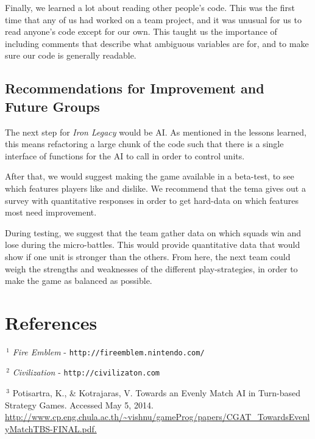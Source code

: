 \documentclass{article}
\begin{document}
Finally, we learned a lot about reading other people's code.
    This was the first time that any of us had worked on a team project,
    and it was unusual for us to read anyone's code except for our own.
    This taught us the importance of including comments that describe what
    ambiguous variables are for, and to make sure our code is generally
    readable.

\subsection*{Recommendations for Improvement and Future Groups}

The next step for \emph{Iron Legacy} would be AI.
    As mentioned in the lessons learned, this means refactoring a large
    chunk of the code such that there is a single interface
    of functions for the AI to call in order to control units.

After that, we would suggest making the game available in a beta-test,
    to see which features players like and dislike.
    We recommend that the tema gives out a survey with quantitative
    responses in order to get hard-data on which features most need
    improvement.

During testing, we suggest that the team gather data on which squads
    win and lose during the micro-battles.
    This would provide quantitative data that would show if one unit
    is stronger than the others.
    From here, the next team could weigh the strengths and
    weaknesses of the different play-strategies, in order to make
    the game as balanced as possible.


\section*{References}

\noindent
$\,^1$
\emph{Fire Emblem} - {\tt http://fireemblem.nintendo.com/}

\vspace{.3em}

\noindent
$\,^2$
\emph{Civilization} - {\tt http://civilizaton.com}

\vspace{.3em}

\noindent
\hangindent=1cm
$\,^3$
Potisartra, K., \& Kotrajaras, V. Towards an Evenly Match AI in Turn-based Strategy Games. Accessed May 5, 2014. \url{http://www.cp.eng.chula.ac.th/~vishnu/gameProg/papers/CGAT_TowardsEvenlyMatchTBS-FINAL.pdf.}
\end{document}
